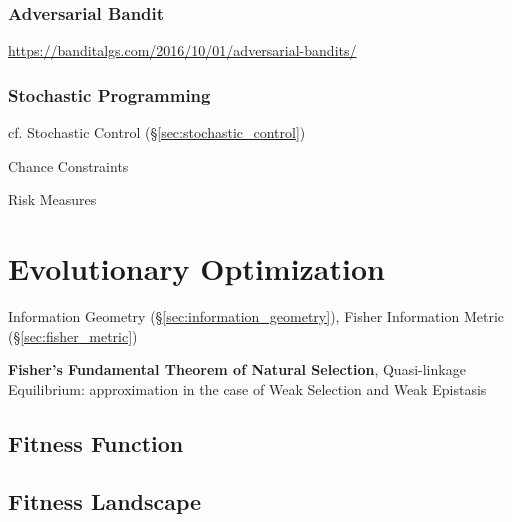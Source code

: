 \subsubsection{Adversarial Bandit}\label{sec:adversarial_bandit}

\url{https://banditalgs.com/2016/10/01/adversarial-bandits/}



\subsubsection{Stochastic Programming}\label{sec:stochastic_programming}


cf. Stochastic Control (\S\ref{sec:stochastic_control})

Chance Constraints

Risk Measures



\section{Evolutionary Optimization}\label{sec:evolutionary_optimization}

\fist Information Geometry (\S\ref{sec:information_geometry}), Fisher
Information Metric (\S\ref{sec:fisher_metric})

\fist \textbf{Fisher's Fundamental Theorem of Natural Selection},
Quasi-linkage Equilibrium: approximation in the case of Weak Selection
and Weak Epistasis %



\subsection{Fitness Function}\label{sec:fitness_function}

\subsection{Fitness Landscape}\label{sec:fitness_landscape}

